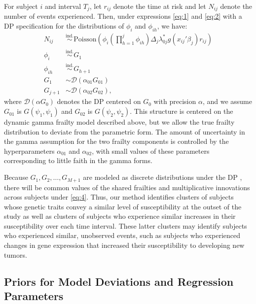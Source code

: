\documentclass[10pt, letterpaper]{article}
\begin{document}
For subject $i$ and interval $T_j$, let $r_{ij}$ denote the time at risk and let $N_{ij}$ denote the number of events experienced. Then, under expressions \eqref{eq:1} and \eqref{eq:2} with a DP specification for the distributions of $\phi_i$ and $\phi_{ih}$, we have:
\begin{equation} \label{eq:4}
\begin{aligned}
 N_{ij} &\stackrel{\text{ind.}}{\sim} \text{Poisson}\left(\phi_i \left(\prod_{h=1}^{j} \phi_{ih}\right) \Delta_j \lambda_{0j}^* g(x_{ij}' \beta_j) r_{ij}\right) \\
 \phi_i &\stackrel{\text{ind.}}{\sim} G_1 \\
 \phi_{ih} &\stackrel{\text{ind.}}{\sim} G_{h+1} \\ 
 G_1 &\sim \mathcal{D}(\alpha_{01} G_{01}) \\
 G_{j+1} &\sim \mathcal{D}(\alpha_{02} G_{02}), 
\end{aligned}
\end{equation}
where $\mathcal{D}(\alpha G_0)$ denotes the DP centered on $G_0$ with precision $\alpha$, and we assume $G_{01}$ is $G(\psi_1, \psi_1)$ and $G_{02}$ is $G(\psi_2, \psi_2)$. This structure is centered on the dynamic gamma frailty model described above, but we allow the true frailty distribution to deviate from the parametric form. The amount of uncertainty in the gamma assumption for the two frailty components is controlled by the hyperparameters $\alpha_{01}$ and $\alpha_{02}$, with small values of these parameters corresponding to little faith in the gamma forms.

Because $G_1, G_2, \dots, G_{M+1}$ are modeled as discrete distributions under the DP \citep{Blackwell1973}, there will be common values of the shared frailties and multiplicative innovations across subjects under \eqref{eq:4}. Thus, our method identifies clusters of subjects whose genetic traits convey a similar level of susceptibility at the outset of the study as well as clusters of subjects who experience similar increases in their susceptibility over each time interval. These latter clusters may identify subjects who experienced similar, unobserved events, such as subjects who experienced changes in gene expression that increased their susceptibility to developing new tumors.

\subsection{Priors for Model Deviations and Regression Parameters}
\end{document}
